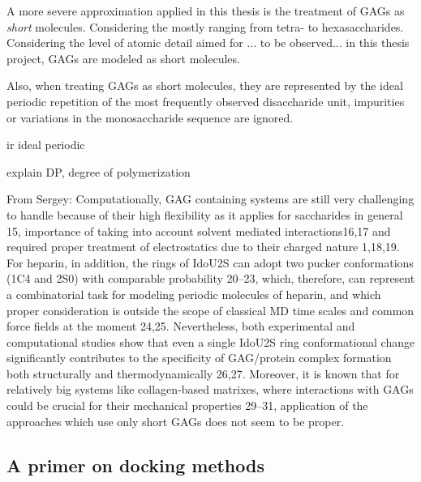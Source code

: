 
A more severe approximation applied in this thesis is the treatment of GAGs as
\textit{short} molecules. Considering the  mostly ranging from tetra- to hexasaccharides. Considering the level of atomic detail aimed for ... to be observed... in this
thesis project, GAGs are modeled as short molecules.


Also, when treating GAGs as short molecules, they are represented by the ideal
periodic repetition of the most frequently observed disaccharide unit,
impurities or variations in the monosaccharide sequence are ignored.

ir ideal periodic

explain DP, degree of polymerization



From Sergey: Computationally, GAG containing systems are still very challenging
to handle because of their high flexibility as it applies for saccharides in
general 15, importance of taking into account solvent mediated interactions16,17
and required proper treatment of electrostatics due to their charged nature
1,18,19. For heparin, in addition, the rings of IdoU2S can adopt two pucker
conformations (1C4 and 2S0) with comparable probability 20–23, which, therefore,
can represent a combinatorial task for modeling periodic molecules of heparin,
and which proper consideration is outside the scope of classical MD time scales
and common force fields at the moment 24,25. Nevertheless, both experimental and
computational studies show that even a single IdoU2S ring conformational change
significantly contributes to the specificity of GAG/protein complex formation
both structurally and thermodynamically 26,27. Moreover, it is known
that for relatively big systems like collagen-based matrixes, where interactions
with GAGs could be crucial for their mechanical properties 29–31, application of
the approaches which use only short GAGs does not seem to be proper.



\subsection{A primer on docking methods}


